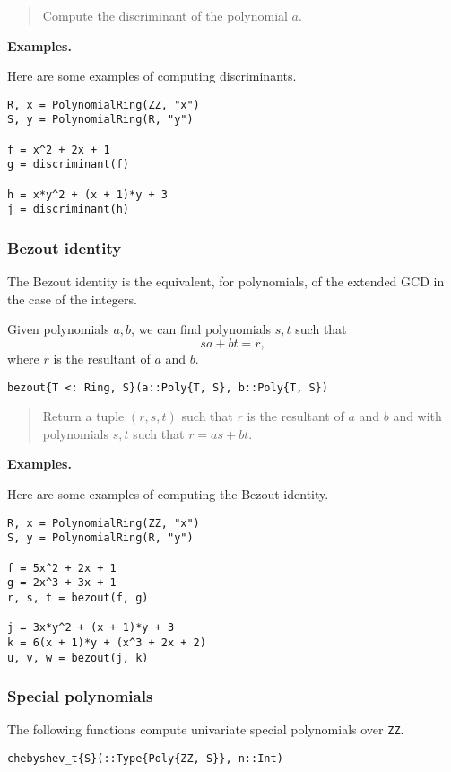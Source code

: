 \documentclass[a4paper,10pt]{article}
\newcommand{\code}{\lstinline}
\newcommand{\desc}[1]{\vspace{-3mm}\begin{quote}#1\end{quote}}
\begin{document}
{{{\desc{Compute the discriminant of the polynomial $a$.}

\textbf{Examples.}

Here are some examples of computing discriminants.

\begin{lstlisting}
R, x = PolynomialRing(ZZ, "x")
S, y = PolynomialRing(R, "y")

f = x^2 + 2x + 1
g = discriminant(f)

h = x*y^2 + (x + 1)*y + 3
j = discriminant(h)
\end{lstlisting}

\subsubsection{Bezout identity}

The Bezout identity is the equivalent, for polynomials, of the extended GCD
in the case of the integers.

Given polynomials $a, b$, we can find polynomials $s, t$ such that
$$sa + bt = r,$$
where $r$ is the resultant of $a$ and $b$.

\begin{lstlisting}
bezout{T <: Ring, S}(a::Poly{T, S}, b::Poly{T, S})
\end{lstlisting}

\desc{Return a tuple $(r, s, t)$ such that $r$ is the resultant of $a$ and $b$
and with polynomials $s, t$ such that $r = as + bt$.}

\textbf{Examples.}

Here are some examples of computing the Bezout identity.

\begin{lstlisting}
R, x = PolynomialRing(ZZ, "x")
S, y = PolynomialRing(R, "y")

f = 5x^2 + 2x + 1
g = 2x^3 + 3x + 1
r, s, t = bezout(f, g)

j = 3x*y^2 + (x + 1)*y + 3
k = 6(x + 1)*y + (x^3 + 2x + 2)
u, v, w = bezout(j, k)
\end{lstlisting}

\subsubsection{Special polynomials}

The following functions compute univariate special polynomials over \code{ZZ}.

\begin{lstlisting}
chebyshev_t{S}(::Type{Poly{ZZ, S}}, n::Int)
\end{lstlisting}

}}}
\end{document}
